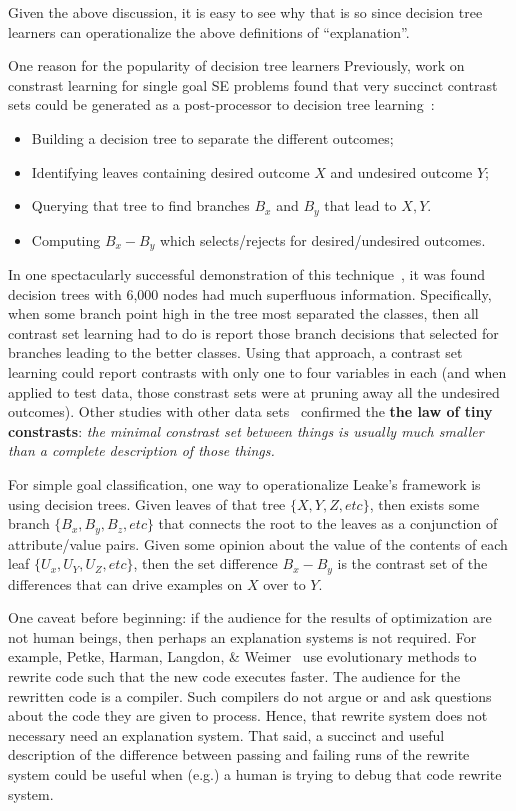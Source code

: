 \documentclass[runningheads]{llncs}
\newcommand{\bi}{\begin{itemize}}
\newcommand{\ei}{\end{itemize}}
\begin{document}
Given the above discussion, it is easy to see why that is so since decision
tree learners can operationalize the above definitions of ``explanation''.

One reason for the popularity of decision tree learners 
Previously, work on
constrast learning for single goal SE problems
found that very succinct contrast sets could be generated as a post-processor
to decision tree learning~\cite{me00e}:
\bi
\item Building a decision tree to separate the different outcomes;
\item Identifying leaves containing desired outcome $X$ and undesired outcome $Y$;
\item Querying that tree to find branches $B_x$ and $B_y$ that lead to
$X,Y$.
\item Computing  $B_x - B_y$ which   selects/rejects for
desired/undesired outcomes.
\ei
In one spectacularly successful demonstration of this technique~\cite{me03c}, it was found decision trees with 6,000 nodes had much
superfluous information.
Specifically, when 
some branch point high in the tree
most separated  the classes, then all contrast
set learning had to do is report those branch decisions that selected
for branches leading to the better classes.
Using that approach, a contrast set learning
could report 
contrasts   with only one to four variables in each (and when
applied to test data, those constrast sets were
at pruning away all the undesired outcomes). Other studies
with other data sets~\cite{me07} 
confirmed the {\bf
the law of tiny constrasts}:  {\em 
the minimal constrast set between things is usually much smaller
than a complete description of those things.}


For simple goal classification, one way to operationalize Leake's
framework is using decision trees. Given leaves of that tree $\{X,Y,Z,etc\}$, 
then exists some branch $\{B_x,B_y,B_z,etc\}$ that connects the root to the leaves
as a conjunction of attribute/value pairs.
Given some
opinion about the value of the contents of each leaf $\{U_x,U_Y,U_Z, etc\}$,  
then the set difference $B_x - B_y$ is the contrast set of the differences
that can drive examples on $X$ over to $Y$.


One caveat before beginning: if the audience for the
results of optimization are not human beings, then
perhaps an explanation systems is not required. For
example, Petke, Harman, Langdon, \&
Weimer~\cite{petke14} use evolutionary methods to
rewrite code such that the new code executes
faster. The audience for the rewritten code is a
compiler. Such compilers do not argue or and ask
questions about the code they are given to process.
Hence, that rewrite system does not necessary need
an explanation system.  That said, a succinct and
useful description of the difference between passing
and failing runs of the rewrite system could be
useful when (e.g.) a human is trying to debug that
code rewrite system.
\end{document}
